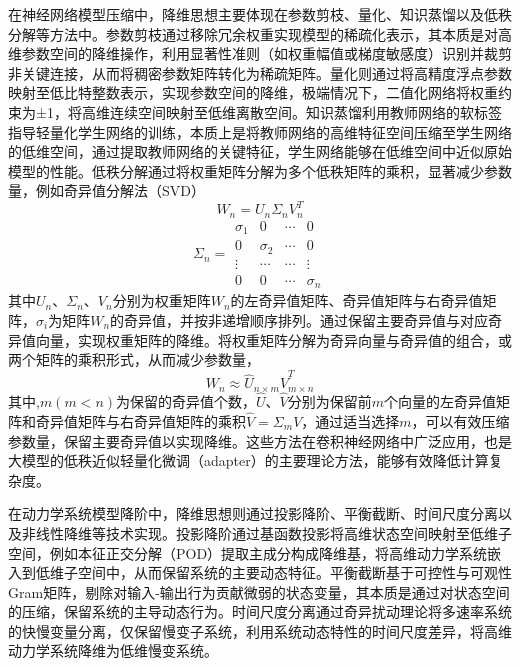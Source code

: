 在神经网络模型压缩中，降维思想主要体现在参数剪枝\cite{liu2023filter}、量化\cite{jacob2018quantization}、知识蒸馏\cite{hinton2015distilling}以及低秩分解\cite{han2015deep}等方法中。参数剪枝通过移除冗余权重实现模型的稀疏化表示，其本质是对高维参数空间的降维操作，利用显著性准则（如权重幅值或梯度敏感度）识别并裁剪非关键连接，从而将稠密参数矩阵转化为稀疏矩阵。量化则通过将高精度浮点参数映射至低比特整数表示，实现参数空间的降维，极端情况下，二值化网络将权重约束为±1，将高维连续空间映射至低维离散空间。知识蒸馏利用教师网络的软标签指导轻量化学生网络的训练，本质上是将教师网络的高维特征空间压缩至学生网络的低维空间，通过提取教师网络的关键特征，学生网络能够在低维空间中近似原始模型的性能。低秩分解通过将权重矩阵分解为多个低秩矩阵的乘积，显著减少参数量，例如奇异值分解法（SVD）
\begin{equation}
  \label{eq:svd}
  W_n = U_n\Sigma_n {V_n^T}
\end{equation}
\begin{equation}
  \label{eq:Sigma}
{\Sigma_n} = \begin{array}{*{20}{c}}
  {{\sigma _1}}&0& \cdots &0\\
  0&{{\sigma _2}}& \cdots &0\\
   \vdots & \cdots & \cdots & \vdots \\
  0&0& \cdots &{{\sigma _n}}
  \end{array}
\end{equation}
其中$U_n$、$\Sigma_n$、$V_n$分别为权重矩阵$W_n$的左奇异值矩阵、奇异值矩阵与右奇异值矩阵，$\sigma_i$为矩阵$W_n$的奇异值，并按非递增顺序排列。通过保留主要奇异值与对应奇异值向量，实现权重矩阵的降维。将权重矩阵分解为奇异向量与奇异值的组合，或两个矩阵的乘积形式，从而减少参数量，
\begin{equation}
  \label{eq:lowrank}
  W_n \approx {\hat{U}_{n\times m}}{\hat{V}_{m\times n}^T}
\end{equation}
其中,$m(m<n)$为保留的奇异值个数，$\hat{U}$、$\hat{V}$分别为保留前$m$个向量的左奇异值矩阵和奇异值矩阵与右奇异值矩阵的乘积$\hat{V}=\Sigma_mV$，通过适当选择$m$，可以有效压缩参数量，保留主要奇异值以实现降维。这些方法在卷积神经网络中广泛应用，也是大模型的低秩近似轻量化微调（adapter）\cite{houlsby2019parameter}的主要理论方法，能够有效降低计算复杂度。

在动力学系统模型降阶中，降维思想则通过投影降阶、平衡截断、时间尺度分离以及非线性降维等技术实现。投影降阶通过基函数投影将高维状态空间映射至低维子空间，例如本征正交分解（POD）提取主成分构成降维基，将高维动力学系统嵌入到低维子空间中，从而保留系统的主要动态特征。平衡截断基于可控性与可观性Gram矩阵，剔除对输入-输出行为贡献微弱的状态变量，其本质是通过对状态空间的压缩，保留系统的主导动态行为。时间尺度分离通过奇异扰动理论将多速率系统的快慢变量分离，仅保留慢变子系统，利用系统动态特性的时间尺度差异，将高维动力学系统降维为低维慢变系统。

